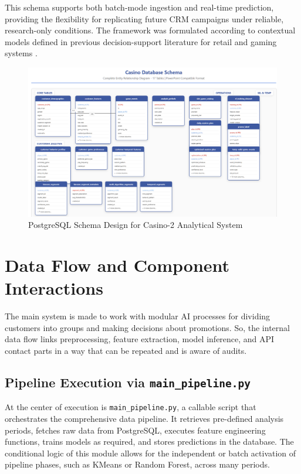 \documentclass[12pt,a4paper]{report}
\begin{document}
This schema supports both batch-mode ingestion and real-time prediction, providing the flexibility for replicating future CRM campaigns under reliable, research-only conditions.  The framework was formulated according to contextual models defined in previous decision-support literature for retail and gaming systems \citep{Ghaharian2022, Abarbanel2022}.

\begin{figure}[H]
\centering
\includegraphics[width=\textwidth]{figures/casino_db_diagram.png}
\caption{PostgreSQL Schema Design for Casino-2 Analytical System}
\label{fig:casino_schema}
\end{figure}


\section{Data Flow and Component Interactions}

The main system is made to work with modular AI processes for dividing customers into groups and making decisions about promotions.  So, the internal data flow links preprocessing, feature extraction, model inference, and API contact parts in a way that can be repeated and is aware of audits.

\subsection{Pipeline Execution via \texttt{main\_pipeline.py}}

At the center of execution is \texttt{main\_pipeline.py}, a callable script that orchestrates the comprehensive data pipeline. It retrieves pre-defined analysis periods, fetches raw data from PostgreSQL, executes feature engineering functions, trains models as required, and stores predictions in the database.  The conditional logic of this module allows for the independent or batch activation of pipeline phases, such as KMeans or Random Forest, across many periods.
\end{document}
